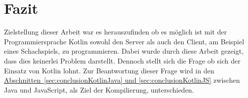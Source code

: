 
\chapter{Fazit}
Zielstellung dieser Arbeit war es herauszufinden ob es möglich ist mit der Programmiersprache Kotlin sowohl den Server als auch den Client, am Beispiel eines Schachspiels, zu programmieren. Dabei wurde durch diese Arbeit gezeigt, dass dies keinerlei Problem darstellt. Dennoch stellt sich die Frage ob sich der Einsatz von Kotlin lohnt. Zur Beantwortung dieser Frage wird in den \hyperref[sec:conclusionKotlinJava, sec:conclusionKotlinJS]{Abschnitten~\ref{sec:conclusionKotlinJava} und \ref{sec:conclusionKotlinJS}} zwischen Java und JavaScript, als Ziel der Kompilierung, unterschieden.

